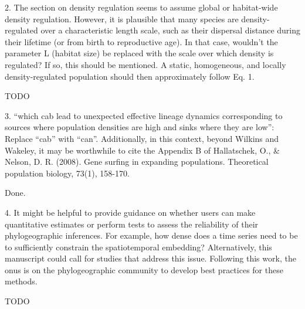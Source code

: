 \documentclass[11pt, oneside]{article}   	%
\newcommand{\response}[1]{{\color{black}{\bf Response:} #1}}
\begin{document}
2. The section on density regulation seems to assume global or habitat-wide density regulation. However, it is plausible that many species are density-regulated over a characteristic length scale, such as their dispersal distance during their lifetime (or from birth to reproductive age). In that case, wouldn’t the parameter  L  (habitat size) be replaced with the scale over which density is regulated? If so, this should be mentioned. A static, homogeneous, and locally density-regulated population should then approximately follow Eq. 1.

\response{TODO}


3. ``which cab lead to unexpected effective lineage dynamics corresponding to sources where population densities are high and sinks where they are low'': Replace ``cab'' with ``can''. Additionally, in this context, beyond Wilkins and Wakeley, it may be worthwhile to cite the Appendix B of Hallatschek, O., & Nelson, D. R. (2008). Gene surfing in expanding populations. Theoretical population biology, 73(1), 158-170.

\response{Done.}


4. It might be helpful to provide guidance on whether users can make quantitative estimates or perform tests to assess the reliability of their phylogeographic inferences. For example, how dense does a time series need to be to sufficiently constrain the spatiotemporal embedding? Alternatively, this manuscript could call for studies that address this issue. Following this work, the onus is on the phylogeographic community to develop best practices for these methods.

\response{TODO}
\end{document}

